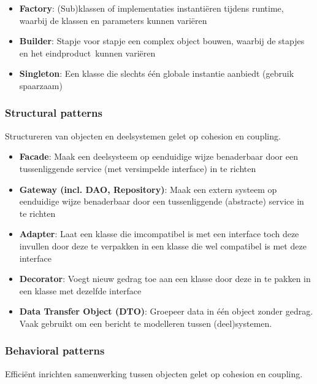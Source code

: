 \documentclass[dutch,a4paper,12pt,doubleside]{book}
\begin{document}
\begin{itemize}
    \item \textbf{Factory}: 
    (Sub)klassen of implementaties instantiëren tijdens runtime,
     waarbij de klassen en parameters kunnen variëren
    \item \textbf{Builder}: 
    Stapje voor stapje een complex object bouwen, 
    waarbij de stapjes en het eindproduct kunnen variëren
    \item \textbf{Singleton}:
    Een klasse die slechts één globale instantie aanbiedt 
    (gebruik spaarzaam)
\end{itemize}

\subsubsection{Structural patterns}
Structureren van objecten en deelsystemen
gelet op cohesion en coupling.

\begin{itemize}
    \item \textbf{Facade}:
    Maak een deelsysteem op eenduidige wijze 
    benaderbaar door een tussenliggende service 
    (met versimpelde interface) in te richten
    \item \textbf{Gateway (incl. DAO, Repository)}:
    Maak een extern systeem op eenduidige wijze 
    benaderbaar door een tussenliggende 
    (abstracte) service in te richten
    \item \textbf{Adapter}:
    Laat een klasse die imcompatibel is met 
    een interface toch deze invullen 
    door deze te verpakken in een klasse 
    die wel compatibel is met deze interface
    \item \textbf{Decorator}:
    Voegt nieuw gedrag toe aan een klasse 
    door deze in te pakken in een klasse 
    met dezelfde interface
    \item \textbf{Data Transfer Object (DTO)}:
    Groepeer data in één object zonder gedrag. 
    Vaak gebruikt om een bericht te modelleren
    tussen (deel)systemen.

\end{itemize}

\subsubsection{Behavioral patterns}
Efficiënt inrichten samenwerking tussen objecten
gelet op cohesion en coupling.
\end{document}
